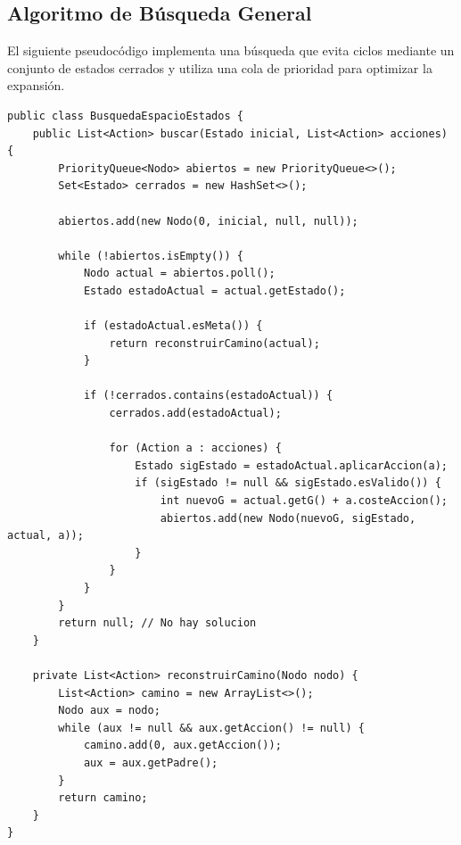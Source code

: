\subsection{Algoritmo de Búsqueda General}
El siguiente pseudocódigo implementa una búsqueda que evita ciclos mediante un conjunto de estados cerrados y utiliza una cola de prioridad para optimizar la expansión.

\begin{lstlisting}[caption=Algoritmo de Búsqueda corregido]
public class BusquedaEspacioEstados {
    public List<Action> buscar(Estado inicial, List<Action> acciones) {
        PriorityQueue<Nodo> abiertos = new PriorityQueue<>();
        Set<Estado> cerrados = new HashSet<>();

        abiertos.add(new Nodo(0, inicial, null, null));

        while (!abiertos.isEmpty()) {
            Nodo actual = abiertos.poll();
            Estado estadoActual = actual.getEstado();

            if (estadoActual.esMeta()) {
                return reconstruirCamino(actual);
            }

            if (!cerrados.contains(estadoActual)) {
                cerrados.add(estadoActual);

                for (Action a : acciones) {
                    Estado sigEstado = estadoActual.aplicarAccion(a);
                    if (sigEstado != null && sigEstado.esValido()) {
                        int nuevoG = actual.getG() + a.costeAccion();
                        abiertos.add(new Nodo(nuevoG, sigEstado, actual, a));
                    }
                }
            }
        }
        return null; // No hay solucion
    }

    private List<Action> reconstruirCamino(Nodo nodo) {
        List<Action> camino = new ArrayList<>();
        Nodo aux = nodo;
        while (aux != null && aux.getAccion() != null) {
            camino.add(0, aux.getAccion());
            aux = aux.getPadre();
        }
        return camino;
    }
}
\end{lstlisting}

